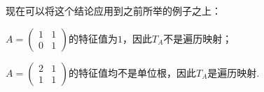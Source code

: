 现在可以将这个结论应用到之前所举的例子之上： \par
$A=\begin{pmatrix}
    1 & 1 \\
    0 & 1
\end{pmatrix}$的特征值为$1$，因此$T_A$不是遍历映射；\par
$A=\begin{pmatrix}
    2 & 1 \\
    1 & 1
\end{pmatrix}$的特征值均不是单位根，因此$T_A$是遍历映射.










